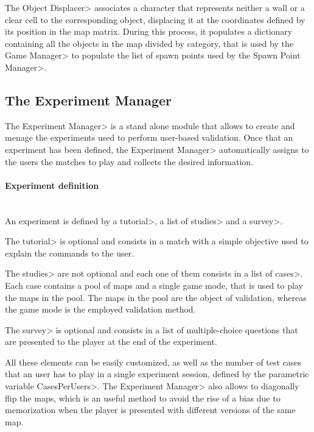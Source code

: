 The \<Object Displacer> associates a character that represents neither a wall or a clear cell to the corresponding object, displacing it at the coordinates defined by its position in the map matrix. During this process, it populates a dictionary containing all the objects in the map divided by category, that is used by the \<Game Manager> to populate the list of spawn points used by the \<Spawn Point Manager>.


\subsection{The Experiment Manager}

The \<Experiment Manager> is a stand alone module that allows to create and menage the experiments used to perform user-based validation. Once that an experiment has been defined, the \<Experiment Manager> automatically assigns to the users the matches to play and collects the desired information.

\paragraph{Experiment definition}

\mbox{}\\

{\setlength{\parindent}{0cm}
An experiment is defined by a \<tutorial>, a list of \<studies> and a \<survey>.}

\par

The \<tutorial> is optional and consists in a match with a simple objective used to explain the commands to the user.

\par

The \<studies> are not optional and each one of them consists in a list of \<cases>. Each case contains a pool of maps and a single game mode, that is used to play the maps in the pool. The maps in the pool are the object of validation, whereas the game mode is the employed validation method.

\par

The \<survey> is optional and consists in a list of multiple-choice questions that are presented to the player at the end of the experiment.

\par

All these elements can be easily customized, as well as the number of test cases that an user has to play in a single experiment session, defined by the parametric variable \<CasesPerUsers>. The \<Experiment Manager> also allows to diagonally flip the maps, which is an useful method to avoid the rise of a bias due to memorization when the player is presented with different versions of the same map.

